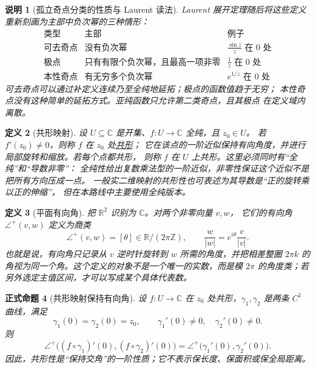 \documentclass[UTF8,fontset=none,a4paper,11pt]{ctexart}
\theoremstyle{foundation-definition}
\newtheorem{definition}{定义}[section]
\theoremstyle{foundation-theorem}
\theoremstyle{foundation-proposition}
\newtheorem{proposition}[definition]{正式命题}
\theoremstyle{foundation-example}
\theoremstyle{foundation-remark}
\newtheorem{remark}[definition]{说明}
\theoremstyle{foundation-theorem}
\newcommand{\term}[2]{\hyperref[#1]{#2}}
\begin{document}
\begin{remark}[孤立奇点分类的性质与 Laurent 读法]\label{rem:isolated-singularity-classification}
Laurent 展开定理随后将这些定义重新刻画为主部中负次幂的三种情形：
\[
\begin{array}{c|c|c}
\text{类型}&\text{主部}&\text{例子}\\
\hline
\text{可去奇点}&\text{没有负次幂}&\displaystyle \frac{\sin z}{z}\text{ 在 }0\text{ 处}\\
\text{极点}&\text{只有有限个负次幂，且最高一项非零}
  &\displaystyle \frac1z\text{ 在 }0\text{ 处}\\
\text{本性奇点}&\text{有无穷多个负次幂}
  &\displaystyle e^{1/z}\text{ 在 }0\text{ 处}
\end{array}
\]
可去奇点可以通过补定义连续乃至全纯地延拓；极点的函数值趋于无穷；
本性奇点没有这种简单的延拓方式。亚纯函数只允许第二类奇点，且其极点
在定义域内离散。
\end{remark}

\begin{definition}[共形映射]\label{def:conformal}
设 \(U\subseteq\mathbb C\) 是开集、\(f:U\to\mathbb C\) 全纯，且 \(z_0\in U\)。
若 \(f'(z_0)\neq0\)，则称 \(f\) 在 \(z_0\) 处\term{def:conformal}{共形}；
它在该点的一阶近似保持有向角度，并进行局部旋转和缩放。若每个点都共形，
则称 \(f\) 在 \(U\) 上共形。这里必须同时有“全纯”和“导数非零”：
全纯性给出复数乘法型的一阶近似，非零性保证这个近似不是把所有方向压成一点。
一般实二维映射的共形性也可表述为其导数是“正的旋转乘以正的伸缩”，
但在本路线中主要使用全纯版本。
\end{definition}

\begin{definition}[平面有向角]\label{def:oriented-angle}
把 \(\mathbb R^2\) 识别为 \(\mathbb C\)。对两个非零向量 \(v,w\)，
它们的有向角 \(\angle^+(v,w)\) 定义为商类
\[
\angle^+(v,w)=[\theta]\in\mathbb R/(2\pi\mathbb Z),
\qquad
\frac{w}{|w|}=e^{i\theta}\frac{v}{|v|}.
\]
也就是说，有向角只记录从 \(v\) 逆时针旋转到 \(w\) 所需的角度，并把相差整圈
\(2\pi k\) 的角视为同一个角。这个定义的对象不是一个唯一的实数，而是模 \(2\pi\)
的角度类；若另外选定主值区间，才可以写成某个具体代表数。
\end{definition}

\begin{proposition}[共形映射保持有向角]\label{prop:conformal-angle}
设 \(f:U\to\mathbb C\) 在 \(z_0\) 处共形，\(\gamma_1,\gamma_2\) 是两条
\(C^1\) 曲线，满足
\[
\gamma_1(0)=\gamma_2(0)=z_0,\qquad
\gamma_1'(0)\ne0,\quad\gamma_2'(0)\ne0.
\]
则
\[
\angle^+\bigl((f\circ\gamma_1)'(0),(f\circ\gamma_2)'(0)\bigr)
=\angle^+\bigl(\gamma_1'(0),\gamma_2'(0)\bigr).
\]
因此，共形性是“保持交角”的一阶性质；它不表示保长度、保面积或保全局距离。
\end{proposition}
\end{document}
